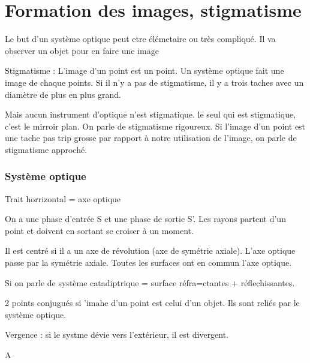 \documentclass[french]{yLectureNote}
\begin{document}
\chapter{Formation des images, stigmatisme}
\begin{definition}
Le but d'un système optique peut etre élémetaire ou très compliqué. Il va observer un objet pour en faire une image
\end{definition}
\begin{definition}
Stigmatisme : L'image d'un point est un point. Un système optique fait une image de chaque points. Si il n'y a pas de stigmatisme, il y a trois taches avec un diamètre de plus en plus grand.
\end{definition}
Mais aucun instrument d'optique n'est stigmatique. le seul qui est stigmatique, c'est le mirroir plan. On parle de stigmatisme rigoureux. Si l'image d'un point est une tache pas trip grosse par rapport à notre utilisation de l'image, on parle de stigmatisme approché.
\subsection{Système optique}
Trait horrizontal = axe optique

On a une phase d'entrée S et une phase de sortie S'. Les rayons partent d'un point et doivent en sortant se croiser à un moment.

Il est centré si il a un axe de révolution (axe de symétrie axiale). L'axe optique passe par la symétrie axiale. Toutes les surfaces ont en commun l'axe optique.

Si on parle de système catadiptrique = surface réfra=ctantes + réflechissantes.

2 points conjugués si 'imahe d'un point est celui d'un objet. Ils sont reliés par le système optique.

Vergence : si le systme dévie vers l'extérieur, il est divergent.

A
\end{document}
